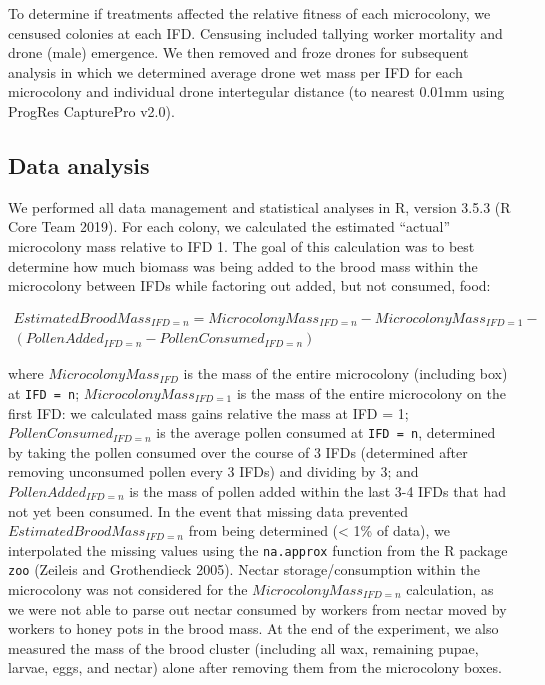 \documentclass[11pt,]{article}
\begin{document}
To determine if treatments affected the relative fitness of each
microcolony, we censused colonies at each IFD. Censusing included
tallying worker mortality and drone (male) emergence. We then removed
and froze drones for subsequent analysis in which we determined average
drone wet mass per IFD for each microcolony and individual drone
intertegular distance (to nearest 0.01mm using ProgRes CapturePro v2.0).

\hypertarget{data-analysis}{%
\subsection{Data analysis}\label{data-analysis}}

We performed all data management and statistical analyses in R, version
3.5.3 (R Core Team 2019). For each colony, we calculated the estimated
``actual'' microcolony mass relative to IFD 1. The goal of this
calculation was to best determine how much biomass was being added to
the brood mass within the microcolony between IFDs while factoring out
added, but not consumed, food:

\[
\begin{aligned}
Estimated Brood Mass_{IFD = n} = Microcolony Mass_{IFD = n} - Microcolony Mass_{IFD = 1} - \\
(Pollen Added_{IFD = n} - Pollen Consumed_{IFD = n})
\end{aligned}
\]

where \(Microcolony Mass_{IFD}\) is the mass of the entire microcolony
(including box) at \texttt{IFD\ =\ n}; \(Microcolony Mass_{IFD = 1}\) is
the mass of the entire microcolony on the first IFD: we calculated mass
gains relative the mass at IFD = 1; \(Pollen Consumed_{IFD = n}\) is the
average pollen consumed at \texttt{IFD\ =\ n}, determined by taking the
pollen consumed over the course of 3 IFDs (determined after removing
unconsumed pollen every 3 IFDs) and dividing by 3; and
\(Pollen Added_{IFD = n}\) is the mass of pollen added within the last
3-4 IFDs that had not yet been consumed. In the event that missing data
prevented \(Estimated Brood Mass_{IFD = n}\) from being determined
(\textless{} 1\% of data), we interpolated the missing values using the
\texttt{na.approx} function from the R package \texttt{zoo} (Zeileis and
Grothendieck 2005). Nectar storage/consumption within the microcolony
was not considered for the \(Microcolony Mass_{IFD = n}\) calculation,
as we were not able to parse out nectar consumed by workers from nectar
moved by workers to honey pots in the brood mass. At the end of the
experiment, we also measured the mass of the brood cluster (including
all wax, remaining pupae, larvae, eggs, and nectar) alone after removing
them from the microcolony boxes.
\end{document}
